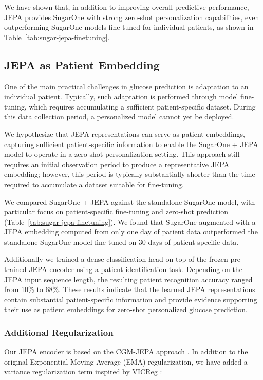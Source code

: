 \documentclass[11pt,a4paper]{article}
\begin{document}
We have shown that, in addition to improving overall predictive performance, JEPA provides SugarOne with strong zero-shot personalization capabilities, even outperforming SugarOne models fine-tuned for individual patients, as shown in Table~\ref{tab:sugar-jepa-finetuning}.


\subsection{JEPA as Patient Embedding}

One of the main practical challenges in glucose prediction is adaptation to an individual patient. Typically, such adaptation is performed through model fine-tuning, which requires accumulating a sufficient patient-specific dataset. During this data collection period, a personalized model cannot yet be deployed.

We hypothesize that JEPA representations can serve as patient embeddings, capturing sufficient patient-specific information to enable the SugarOne + JEPA model to operate in a zero-shot personalization setting. This approach still requires an initial observation period to produce a representative JEPA embedding; however, this period is typically substantially shorter than the time required to accumulate a dataset suitable for fine-tuning.

We compared SugarOne + JEPA against the standalone SugarOne model, with particular focus on patient-specific fine-tuning and zero-shot prediction (Table~\ref{tab:sugar-jepa-finetuning}). We found that SugarOne augmented with a JEPA embedding computed from only one day of patient data outperformed the standalone SugarOne model fine-tuned on 30 days of patient-specific data.

Additionally we trained a dense classification head on top of the frozen pre-trained JEPA encoder using a patient identification task. Depending on the JEPA input sequence length, the resulting patient recognition accuracy ranged from 10\% to 68\%. These results indicate that the learned JEPA representations contain substantial patient-specific information and provide evidence supporting their use as patient embeddings for zero-shot personalized glucose prediction.

\subsubsection{Additional Regularization}

Our JEPA encoder is based on the CGM-JEPA approach \cite{muhammad2026cgm}. In addition to the original Exponential Moving Average (EMA) regularization, we have added a variance regularization term inspired by VICReg \cite{vicreg}:
\end{document}
